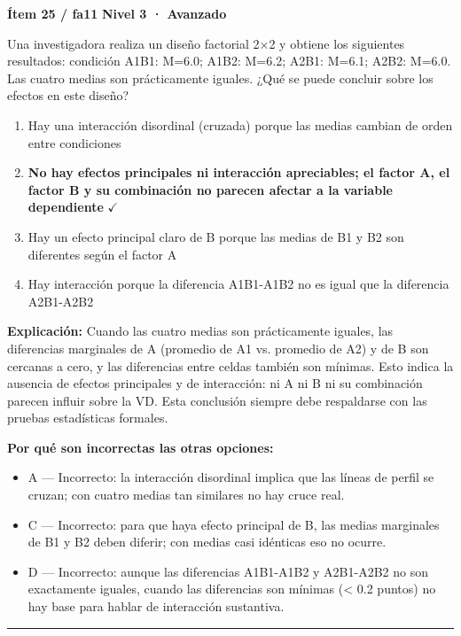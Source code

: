 \documentclass[12pt,a4paper]{article}
\begin{document}
\begin{mdframed}[backgroundcolor=fondogris,linecolor=rojo,linewidth=1pt,innerleftmargin=10pt,innerrightmargin=10pt,innertopmargin=7pt,innerbottommargin=7pt]
\textbf{Ítem 25 / fa11} \hfill {\small\bfseries\color{rojo} Nivel 3 · Avanzado}
\end{mdframed}

Una investigadora realiza un diseño factorial 2×2 y obtiene los siguientes resultados: condición A1B1: M=6.0; A1B2: M=6.2; A2B1: M=6.1; A2B2: M=6.0. Las cuatro medias son prácticamente iguales. ¿Qué se puede concluir sobre los efectos en este diseño?

\begin{enumerate}
  \item[A.] Hay una interacción disordinal (cruzada) porque las medias cambian de orden entre condiciones
  \item[\textbf{\color{verde}B.}] \textbf{\color{verde} No hay efectos principales ni interacción apreciables; el factor A, el factor B y su combinación no parecen afectar a la variable dependiente} \hfill $\checkmark$
  \item[C.] Hay un efecto principal claro de B porque las medias de B1 y B2 son diferentes según el factor A
  \item[D.] Hay interacción porque la diferencia A1B1-A1B2 no es igual que la diferencia A2B1-A2B2
\end{enumerate}

\noindent\textbf{\color{azul}Explicación:} Cuando las cuatro medias son prácticamente iguales, las diferencias marginales de A (promedio de A1 vs. promedio de A2) y de B son cercanas a cero, y las diferencias entre celdas también son mínimas. Esto indica la ausencia de efectos principales y de interacción: ni A ni B ni su combinación parecen influir sobre la VD. Esta conclusión siempre debe respaldarse con las pruebas estadísticas formales.

\noindent\textbf{\color{gris}Por qué son incorrectas las otras opciones:}
\begin{itemize}
  \item {\small A — Incorrecto: la interacción disordinal implica que las líneas de perfil se cruzan; con cuatro medias tan similares no hay cruce real.}
  \item {\small C — Incorrecto: para que haya efecto principal de B, las medias marginales de B1 y B2 deben diferir; con medias casi idénticas eso no ocurre.}
  \item {\small D — Incorrecto: aunque las diferencias A1B1-A1B2 y A2B1-A2B2 no son exactamente iguales, cuando las diferencias son mínimas (< 0.2 puntos) no hay base para hablar de interacción sustantiva.}
\end{itemize}
\vspace{8pt}\hrule\vspace{10pt}
\end{document}
